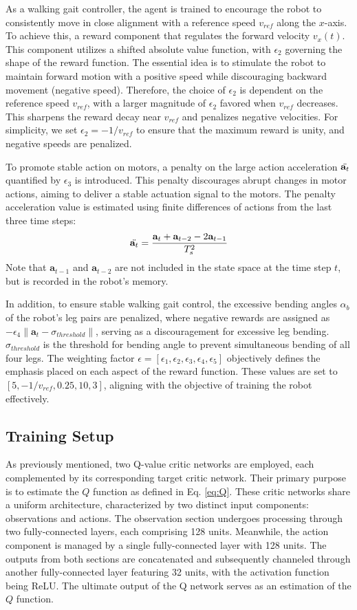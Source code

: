 As a walking gait controller, the agent is trained to encourage the robot to consistently move in close alignment with a reference speed $v_{ref}$ along the $x$-axis. To achieve this, a reward component that regulates the forward velocity $v_x(t)$. This component utilizes a shifted absolute value function, with $\epsilon_2$ governing the shape of the reward function. The essential idea  is to stimulate the robot to maintain forward motion with a positive speed while discouraging backward movement (negative speed). Therefore, the choice of $\epsilon_2$ is dependent on the reference speed $v_{ref}$, with a larger magnitude of $\epsilon_2$ favored when $v_{ref}$ decreases. This sharpens the reward decay near $v_{ref}$ and penalizes negative velocities. For simplicity, we set $\epsilon_2 = −1/v_{ref}$ to ensure that the maximum reward is unity, and negative speeds are penalized. 

To promote stable action on motors, a penalty on the large action acceleration $\Ddot{\mathbf{a}_t}$ quantified by $\epsilon_3$ is introduced. This penalty discourages abrupt changes in motor actions, aiming to deliver a stable actuation signal to the motors. The penalty acceleration value is estimated using finite differences of actions from the last three time steps: $$\Ddot{\mathbf{a}_t} = \frac{\mathbf{a}_t+\mathbf{a}_{t-2}-2\mathbf{a}_{t-1}}{T_s^2}$$ Note that $\mathbf{a}_{t-1}$ and $\mathbf{a}_{t-2}$ are not included in the state space at the time step $t$, but is recorded in the robot's memory.

In addition, to ensure stable walking gait control, the excessive bending angles $\alpha_b$ of the robot's leg pairs are penalized, where negative rewards are assigned as $- \epsilon_4\lVert\mathbf{a}_t-\sigma_{threshold}\rVert$, serving as a discouragement for excessive leg bending. $\sigma_{threshold}$ is the threshold for bending angle to prevent simultaneous bending of all four legs. The weighting factor $\epsilon = [\epsilon_1, \epsilon_2, \epsilon_3, \epsilon_4, \epsilon_5]$ objectively defines the emphasis placed on each aspect of the reward function. These values are set to $[5, −1/v_{ref}, 0.25, 10, 3]$, aligning with the objective of training the robot effectively.

\subsection{Training Setup}
As previously mentioned, two Q-value critic networks are employed, each complemented by its corresponding target critic network. Their primary purpose is to estimate the $Q$ function as defined in Eq. \ref{eq:Q}. These critic networks share a uniform architecture, characterized by two distinct input components: observations and actions. The observation section undergoes processing through two fully-connected layers, each comprising 128 units. Meanwhile, the action component is managed by a single fully-connected layer with 128 units. The outputs from both sections are concatenated and subsequently channeled through another fully-connected layer featuring 32 units, with the activation function being \ac{ReLU}. The ultimate output of the Q network serves as an estimation of the $Q$ function. 

